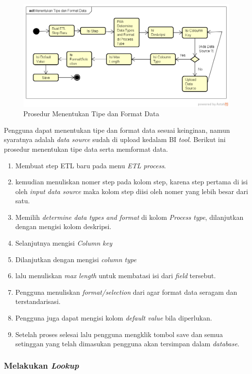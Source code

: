 	\begin{figure}[h]
	\centering
	\includegraphics[scale=0.5]{Gambar/Menentukan-Tipe-dan-Format-Data}
	\caption{Prosedur Menentukan Tipe dan Format Data}
	\end{figure}

	Pengguna dapat menentukan tipe dan format data sesuai keinginan, namun syaratnya adalah \textit{data source} sudah di upload kedalam BI \textit{tool}. Berikut ini prosedur menentukan tipe data serta memformat data.
	\begin{enumerate}
		\item Membuat step ETL baru pada menu \textit{ETL process}.
		\item kemudian menuliskan nomer step pada kolom step, karena step pertama di isi oleh \textit{input data source} maka kolom step diisi oleh nomer yang lebih besar dari satu.
		\item Memilih \textit{determine data types and format} di kolom \textit{Process type}, dilanjutkan dengan mengisi kolom deskripsi.
		\item Selanjutnya mengisi \textit{Column key} 
		\item Dilanjutkan dengan mengisi \textit{column type}
		\item lalu menuliskan \textit{max length} untuk membatasi isi dari \textit{field} tersebut.
		\item Pengguna menuliskan \textit{format/selection} dari agar format data seragam dan terstandarisasi.
		\item Pengguna juga dapat mengisi kolom \textit{default value} bila diperlukan.
		\item Setelah proses selesai lalu pengguna mengklik tombol save dan semua setinggan yang telah dimasukan pengguna akan tersimpan dalam \textit{database}.
	\end{enumerate}
	
\subsubsection{Melakukan \textit{Lookup}}

